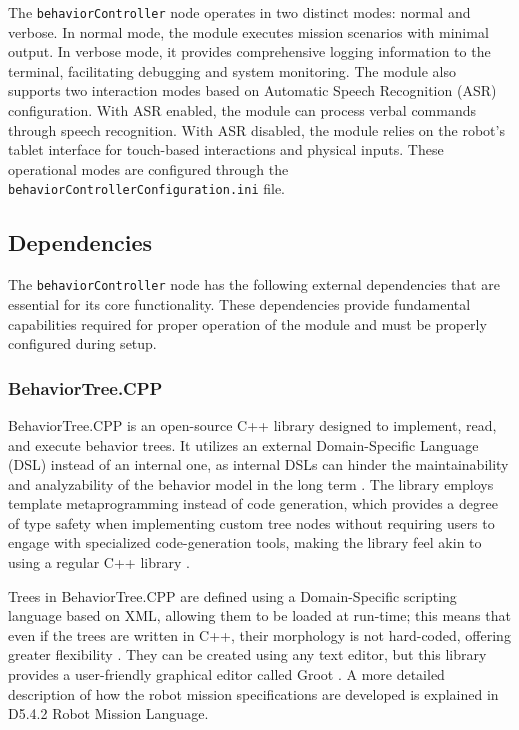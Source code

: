 \documentclass{CSSRforAfrica}
\begin{document}
The \texttt{\small behaviorController} node operates in two distinct modes: normal and verbose. In normal mode, the module executes mission scenarios with minimal output. In verbose mode, it provides comprehensive logging information to the terminal, facilitating debugging and system monitoring. The module also supports two interaction modes based on Automatic Speech Recognition (ASR) configuration. With ASR enabled, the module can process verbal commands through speech recognition. With ASR disabled, the module relies on the robot's tablet interface for touch-based interactions and physical inputs. These operational modes are configured through the \texttt{\small behaviorControllerConfiguration.ini} file.


\subsection{Dependencies}

The \texttt{\small behaviorController} node has the following external dependencies that are essential for its core functionality. These dependencies provide fundamental capabilities required for proper operation of the module and must be properly configured during setup.

\subsubsection{BehaviorTree.CPP}

BehaviorTree.CPP is an open-source C++ library designed to implement, read, and execute behavior trees. It utilizes an external Domain-Specific Language (DSL) instead of an internal one, as internal DSLs can hinder the maintainability and analyzability of the behavior model in the long term \cite{Ghzouli2023}. The library employs template metaprogramming instead of code generation, which provides a degree of type safety when implementing custom tree nodes without requiring users to engage with specialized code-generation tools, making the library feel akin to using a regular C++ library \cite{Ghzouli2020}. 

Trees in BehaviorTree.CPP are defined using a Domain-Specific scripting language based on XML, allowing them to be loaded at run-time; this means that even if the trees are written in C++, their morphology is not hard-coded, offering greater flexibility \cite{BehaviorTreeWebsite}. They can be created using any text editor, but this library provides a user-friendly graphical editor called Groot \cite{Dortmans2022}. A more detailed description of how the robot mission specifications are developed is explained in \textnormal{D5.4.2 Robot Mission Language}.
\end{document}

